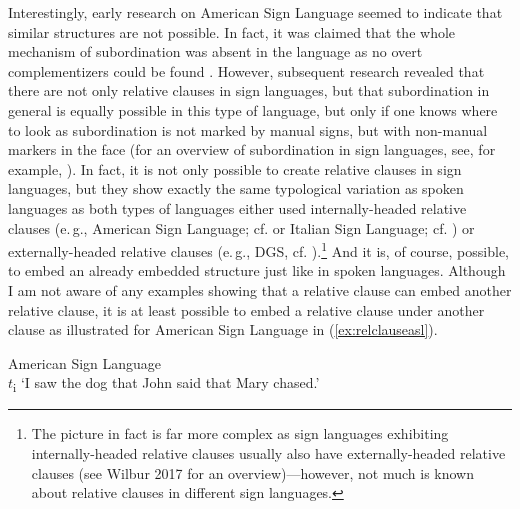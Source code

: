 Interestingly, early research on American Sign Language seemed to indicate that similar structures are not possible. In fact, it was claimed that the whole mechanism of subordination was absent in the language as no overt complementizers could be found \citep{thompson1977lack}. However, subsequent research revealed that there are not only relative clauses in sign languages, but that subordination in general is equally possible in this type of language, but only if one knows where to look as subordination is not marked by manual signs, but with non-manual markers in the face \citep{liddell1980american, padden1983action} (for an overview of subordination in sign languages, see, for example, \citealt{gijn2004quest,branchini2014,pfausteinher2016matterofcompl,pfausteinbach2016complexsentences}). In fact, it is not only possible to create relative clauses in sign languages, but they show exactly the same typological variation as spoken languages as both types of languages either used internally-headed relative clauses (e.\,g., American Sign Language; cf. \citealt{liddell1980american} or Italian Sign Language; cf. \citealt{branchini2014}) or externally-headed relative clauses (e.\,g., DGS, cf.  \citealt{pfau2005relative}).\footnote{ The picture in fact is far more complex as sign languages exhibiting internally-headed relative clauses usually also have externally-headed relative clauses (see Wilbur 2017 for an overview)---however, not much is known about relative clauses in different sign languages.} And it is, of course, possible, to embed an already embedded structure just like in spoken languages. Although I am not aware of any examples showing that a relative clause can embed another relative clause, it is at least possible to embed a relative clause under another clause as illustrated for American Sign Language in (\ref{ex:relclauseasl}). 

\begin{exe}
\ex American Sign Language \citep[10]{wilbur2017internally}\\ %
   $t$\textsubscript{i} 
\glt `I saw the dog that John said that Mary chased.' \label{ex:relclauseasl} 
\end{exe} 

